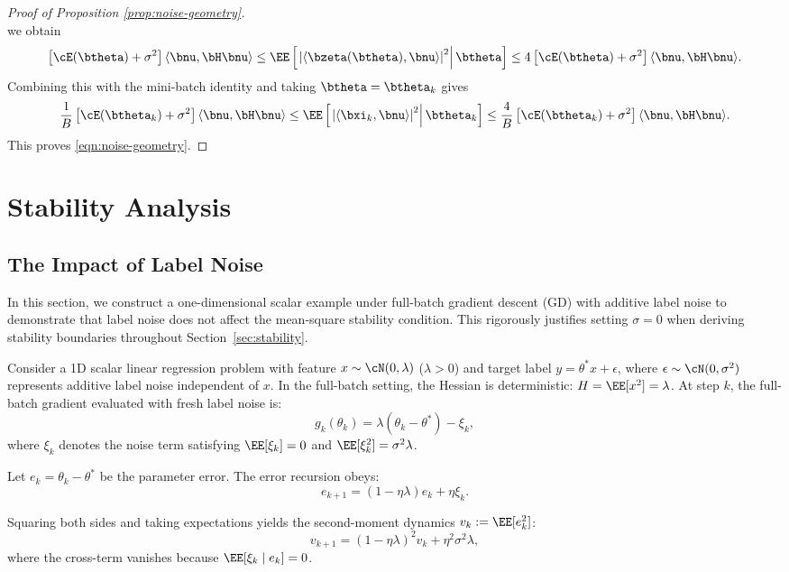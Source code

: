 \begin{proof}[Proof of Proposition \ref{prop:noise-geometry}]
\[\]
we obtain
\[
\left[
    \cE(\btheta)+\sigma^2
\right]
\langle\bnu,\bH\bnu\rangle
\leq
\EE\left[
    \left.
    \left|
        \langle\bzeta(\btheta),\bnu\rangle
    \right|^2
    \right|\btheta
\right]
\leq
4
\left[
    \cE(\btheta)+\sigma^2
\right]
\langle\bnu,\bH\bnu\rangle.
\]
Combining this with the mini-batch identity and taking $\btheta=\btheta_k$ gives
\[
\frac1B
\left[
    \cE(\btheta_k)+\sigma^2
\right]
\langle\bnu,\bH\bnu\rangle
\leq
\EE\left[
    \left.
    \left|
        \langle\bxi_k,\bnu\rangle
    \right|^2
    \right|\btheta_k
\right]
\leq
\frac4B
\left[
    \cE(\btheta_k)+\sigma^2
\right]
\langle\bnu,\bH\bnu\rangle.
\]
This proves \eqref{eqn:noise-geometry}.
\end{proof}


\newpage
\section{Stability Analysis}
\label{app:stability}

\subsection{The Impact of Label Noise}
\label{app:subsec:label noise stability}

In this section, we construct a one-dimensional scalar example under full-batch gradient descent (GD) with additive label noise to demonstrate that label noise does not affect the mean-square stability condition. This rigorously justifies setting $\sigma=0$ when deriving stability boundaries throughout Section~\ref{sec:stability}.

Consider a 1D scalar linear regression problem with feature $x \sim \cN(0, \lambda)$ ($\lambda > 0$) and target label $y = \theta^* x + \epsilon$, where $\epsilon \sim \cN(0, \sigma^2)$ represents additive label noise independent of $x$. In the full-batch setting, the Hessian is deterministic: $H = \EE[x^2] = \lambda$. At step $k$, the full-batch gradient evaluated with fresh label noise is:
\[
    g_k(\theta_k) = \lambda (\theta_k - \theta^*) - \xi_k,
\]
where $\xi_k$ denotes the noise term satisfying $\EE[\xi_k] = 0$ and $\EE[\xi_k^2] = \sigma^2 \lambda$.

Let $e_k = \theta_k - \theta^*$ be the parameter error. The error recursion obeys:
\[
    e_{k+1} = (1 - \eta \lambda) e_k + \eta \xi_k.
\]

Squaring both sides and taking expectations yields the second-moment dynamics $v_k := \EE[e_k^2]$:
\[
    v_{k+1} = (1 - \eta \lambda)^2 v_k + \eta^2 \sigma^2 \lambda,
\]
where the cross-term vanishes because $\EE[\xi_k \mid e_k] = 0$.

